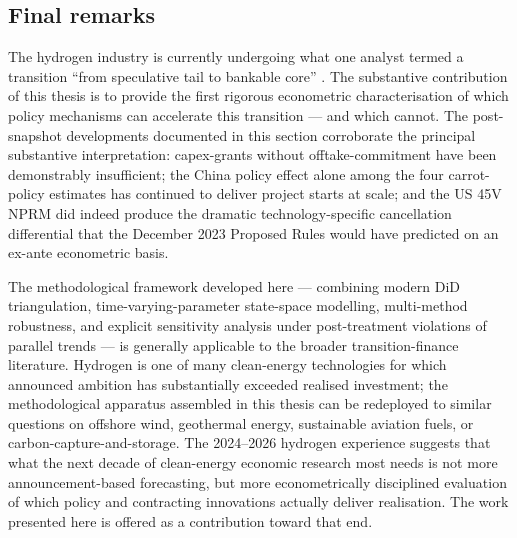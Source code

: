 \subsection*{Final remarks}

The hydrogen industry is currently undergoing what one analyst termed a transition ``from speculative tail to bankable core'' \cite{decarbonizeweekly2026}. The substantive contribution of this thesis is to provide the first rigorous econometric characterisation of which policy mechanisms can accelerate this transition --- and which cannot. The post-snapshot developments documented in this section corroborate the principal substantive interpretation: capex-grants without offtake-commitment have been demonstrably insufficient; the China policy effect alone among the four carrot-policy estimates has continued to deliver project starts at scale; and the US 45V NPRM did indeed produce the dramatic technology-specific cancellation differential that the December 2023 Proposed Rules would have predicted on an ex-ante econometric basis.

The methodological framework developed here --- combining modern DiD triangulation, time-varying-parameter state-space modelling, multi-method robustness, and explicit sensitivity analysis under post-treatment violations of parallel trends --- is generally applicable to the broader transition-finance literature. Hydrogen is one of many clean-energy technologies for which announced ambition has substantially exceeded realised investment; the methodological apparatus assembled in this thesis can be redeployed to similar questions on offshore wind, geothermal energy, sustainable aviation fuels, or carbon-capture-and-storage. The 2024--2026 hydrogen experience suggests that what the next decade of clean-energy economic research most needs is not more announcement-based forecasting, but more econometrically disciplined evaluation of which policy and contracting innovations actually deliver realisation. The work presented here is offered as a contribution toward that end.
